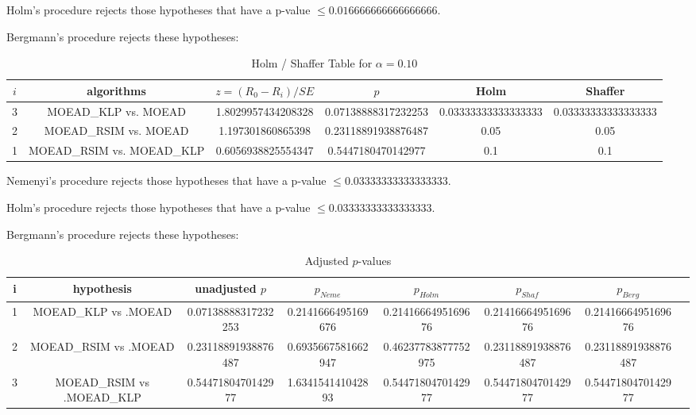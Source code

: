 \documentclass[a4paper,10pt]{article}
\begin{document}
\begin{landscape}
Holm's procedure rejects those hypotheses that have a p-value $\le0.016666666666666666$.


Bergmann's procedure rejects these hypotheses:


\begin{itemize}


\end{itemize}


\begin{table}[!htp]
\centering\tiny
\caption{Holm / Shaffer Table for $\alpha=0.10$}
\begin{tabular}{cccccc}
$i$&algorithms&$z=(R_0 - R_i)/SE$&$p$&Holm&Shaffer\\
\hline
3&MOEAD_KLP vs. MOEAD&1.8029957434208328&0.07138888317232253&0.03333333333333333&0.03333333333333333\\
2&MOEAD_RSIM vs. MOEAD&1.197301860865398&0.23118891938876487&0.05&0.05\\
1&MOEAD_RSIM vs. MOEAD_KLP&0.6056938825554347&0.5447180470142977&0.1&0.1\\
\hline
\end{tabular}
\end{table}
Nemenyi's procedure rejects those hypotheses that have a p-value $\le0.03333333333333333$.


Holm's procedure rejects those hypotheses that have a p-value $\le0.03333333333333333$.


Bergmann's procedure rejects these hypotheses:


\begin{itemize}


\end{itemize}


\begin{table}[!htp]
\centering\tiny
\caption{Adjusted $p$-values}
\begin{tabular}{cccccccc}
i&hypothesis&unadjusted $p$&$p_{Neme}$&$p_{Holm}$&$p_{Shaf}$&$p_{Berg}$\\
\hline
1&MOEAD_KLP vs .MOEAD&0.07138888317232253&0.2141666495169676&0.2141666495169676&0.2141666495169676&0.2141666495169676\\
2&MOEAD_RSIM vs .MOEAD&0.23118891938876487&0.6935667581662947&0.46237783877752975&0.23118891938876487&0.23118891938876487\\
3&MOEAD_RSIM vs .MOEAD_KLP&0.5447180470142977&1.634154141042893&0.5447180470142977&0.5447180470142977&0.5447180470142977\\
\hline
\end{tabular}
\end{table}

\end{landscape}
\end{document}
